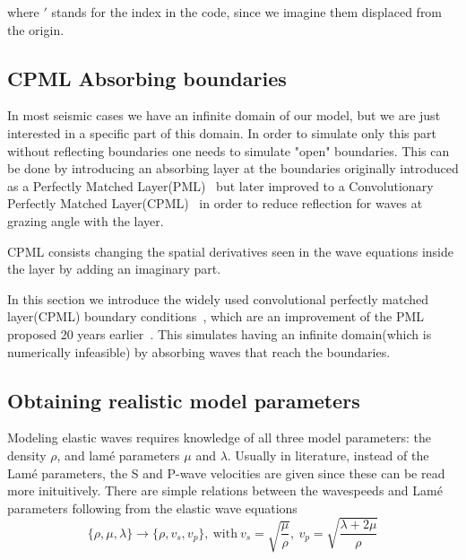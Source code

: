 \documentclass[fleqn,11pt]{SelfArx} %
\theoremstyle{definition}
\begin{document}
where $'$ stands for the index in the code, since we imagine them displaced from the origin.

\subsection{CPML Absorbing boundaries}
In most seismic cases we have an infinite domain of our model, but we are just interested in a specific part of this domain. In order to simulate only this part without reflecting boundaries one needs to simulate "open" boundaries. This can be done by introducing an absorbing layer at the boundaries originally introduced as a Perfectly Matched Layer(PML)~\cite{Berenger1994} but later improved to a Convolutionary Perfectly Matched Layer(CPML)~\cite{Komatitsch2007} in order to reduce reflection for waves at grazing angle with the layer. 

CPML consists changing the spatial derivatives seen in the wave equations inside the layer by adding an imaginary part. 


In this section we introduce the widely used convolutional perfectly matched layer(CPML) boundary conditions~\cite{Komatitsch2007}, which are an improvement of the PML proposed 20 years earlier~\cite{Berenger1994}. This simulates having an infinite domain(which is numerically infeasible) by absorbing waves that reach the boundaries. 

\subsection{Obtaining realistic model parameters}
Modeling elastic waves requires knowledge of all three model parameters: the density $\rho$, and lamé parameters $\mu$ and $\lambda$.
Usually in literature, instead of the Lamé parameters, the S and P-wave velocities are given since these can be read more inituitively. There are simple relations between the wavespeeds and Lamé parameters following from the elastic wave equations 
\begin{equation}\label{eq:conversion_lame_to_velocity}
\{\rho, \mu, \lambda\} \rightarrow \{\rho, v_s, v_p\}, \ \text{with} \ v_s=\sqrt{\frac{\mu}{\rho}}, \ v_p = \sqrt{\frac{\lambda+2\mu}{\rho}} 
\end{equation}
\end{document}
